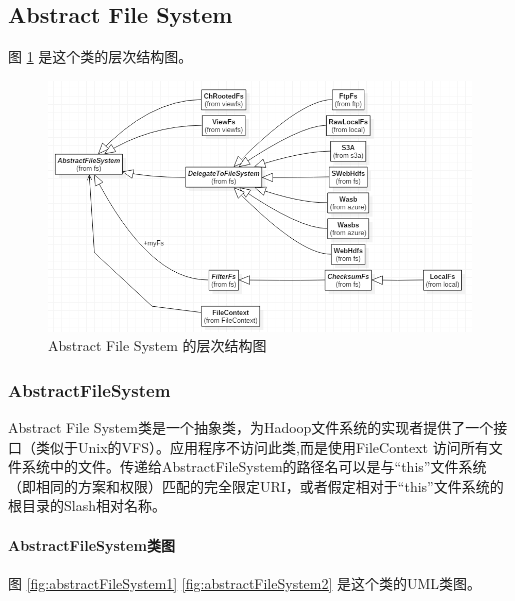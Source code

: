 \subsection{Abstract File System}

图 \ref{fig:architecture} 是这个类的层次结构图。
\begin{figure}
\centering
\includegraphics[width=1\linewidth]{UML/abstractfilesystem/architecture.PNG}
\caption{Abstract File System 的层次结构图}
\label{fig:architecture}
\end{figure}

\subsubsection{AbstractFileSystem}
Abstract File System类是一个抽象类，为Hadoop文件系统的实现者提供了一个接口（类似于Unix的VFS）。应用程序不访问此类,而是使用FileContext 访问所有文件系统中的文件。传递给AbstractFileSystem的路径名可以是与“this”文件系统（即相同的方案和权限）匹配的完全限定URI，或者假定相对于“this”文件系统的根目录的Slash相对名称。

\paragraph{AbstractFileSystem类图}
图 \ref{fig:abstractFileSystem1}  \ref{fig:abstractFileSystem2} 是这个类的UML类图。

